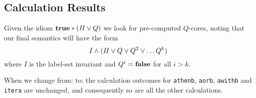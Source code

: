 \subsection{Calculation Results}

Given the idiom $\mathbf{true} * (\mathit{II} \lor Q)$
we look for pre-computed $Q$-cores,
noting that our final semantics will have the form
\[
  I \land ( \mathit{II} \lor Q \lor Q^2 \lor \dots Q^k)
\]
where $I$ is the label-set invariant
and $Q^i = \mathbf{false}$ for all $i > k$.

When we change from:
\noindent
to:
\noindent
the calculation outcomes
for \texttt{athenb}, \texttt{aorb}, \texttt{awithb} and \texttt{itera} are unchanged,
and consequently so are all the other calculations.
